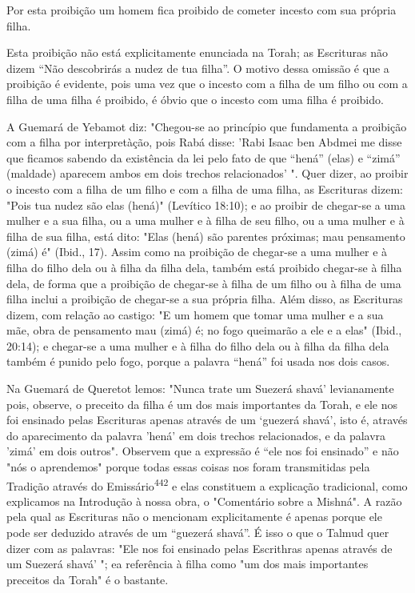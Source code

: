 Por esta proibição um homem fica proibido de cometer incesto com sua
própria filha.

Esta proibição não está explicitamente enunciada na Torah; as
Escri­turas não dizem ``Não descobrirás a nudez de tua filha''. O motivo
dessa omis­são é que a proibição é evidente, pois uma vez que o incesto
com a filha de um filho ou com a filha de uma filha é proibido, é óbvio
que o incesto com uma filha é proibido.

A Guemará de Yebamot diz: "Chegou-se ao princípio que fundamenta a
proibição com a filha por interpretàção, pois Rabá disse: 'Rabi Isaac
ben Abd­mei me disse que ficamos sabendo da existência da lei pelo fato
de que ``hená'' (elas) e ``zimá'' (maldade) aparecem ambos em dois trechos
relacionados' ". Quer dizer, ao proibir o incesto com a filha de um
filho e com a filha de uma filha, as Escrituras dizem: "Pois tua nudez
são elas (hená)" (Levítico 18:10); e ao proi­bir de chegar-se a uma
mulher e a sua filha, ou a uma mulher e à filha de seu filho, ou a uma
mulher e à filha de sua filha, está dito: "Elas (hená) são parentes
próximas; mau pensamento (zimá) é" (Ibid., 17). Assim como na proibição
de chegar-se a uma mulher e à filha do filho dela ou à filha da filha
dela, também está proibido chegar-se à filha dela, de forma que a
proibição de chegar-se à filha de um filho ou à filha de uma filha
inclui a proibição de chegar-se a sua própria filha. Além disso, as
Escrituras dizem, com relação ao castigo: "E um homem que tomar uma
mulher e a sua mãe, obra de pensamento mau (zimá) é; no fogo queimarão a
ele e a elas" (Ibid., 20:14); e chegar-se a uma mulher e à filha do
filho dela ou à filha da filha dela também é punido pelo fogo, por­que a
palavra ``hená'' foi usada nos dois casos.

Na Guemará de Queretot lemos: "Nunca trate um Suezerá shavá'
levianamente pois, observe, o preceito da filha é um dos mais
importantes da Torah, e ele nos foi ensinado pelas Escrituras apenas
através de um `guezerá shavá', isto é, através do aparecimento da
palavra 'hená' em dois trechos rela­cionados, e da palavra 'zimá' em
dois outros". Observem que a expressão é ``ele nos foi ensinado'' e não
"nós o aprendemos" porque todas essas coisas nos foram transmitidas pela
Tradição através do Emissário\textsuperscript{442} e elas constituem a
explicação tradicional, como explicamos na Introdução à nossa obra, o
"Co­mentário sobre a Mishná". A razão pela qual as Escrituras não o
mencionam explicitamente é apenas porque ele pode ser deduzido através
de um ``guezerá shavá''. É isso o que o Talmud quer dizer com as palavras:
"Ele nos foi ensina­do pelas Escrithras apenas através de um Suezerá
shavá' "; ea referência à filha como "um dos mais importantes preceitos
da Torah" é o bastante.


